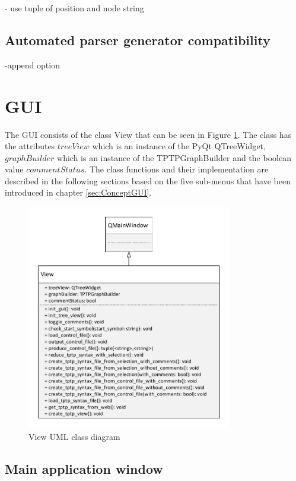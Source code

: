 - use tuple of position and node string

\subsection{Automated parser generator compatibility}\label{sec:ImplementationAutomatedParserGenerator}

-append option

\section{GUI}\label{sec:ImplementationGUI}

The GUI consists of the class View that can be seen in Figure \ref{fig:ImplementationViewClassDiagram}. The class has the attributes $treeView$ which is an instance of the PyQt QTreeWidget, $graphBuilder$ which is an instance of the TPTPGraphBuilder and the boolean value $commentStatus$. The class functions and their implementation are described in the following sections based on the five sub-menus that have been introduced in chapter \ref{sec:ConceptGUI}.

\begin{figure}[H]
\centering
\includegraphics[width=0.8\textwidth]{images/Implementation_view_class_diagramm.pdf}
\caption{View UML class diagram}
\label{fig:ImplementationViewClassDiagram}
\end{figure}

\subsection{Main application window}\label{sec:ImplementationGUIMainAppli}

